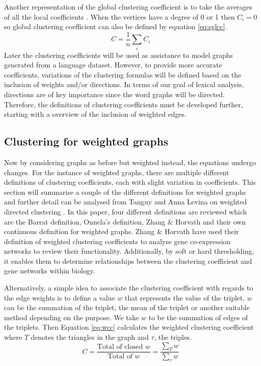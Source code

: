 Another representation of the global clustering coefficient is to take the averages of all the local coefficients \cite{https://doi.org/10.48550/arxiv.1410.1997}. When the vertices have a degree of 0 or 1 then $C_i = 0$ so global clustering coefficient can also be defined by equation \ref{eq:sglcc}.
\begin{equation} \label{eq:sglcc}
C = \frac{1}{n}\sum_i{C_i}
\end{equation}
Later the clustering coefficients will be used as assistance to model graphs generated from a language dataset. However, to provide more accurate coefficients, variations of the clustering formulas will be defined based on the inclusion of weights and/or directions. In terms of our goal of lexical analysis, directions are of key importance since the word graphs will be directed. Therefore, the definitions of clustering coefficients must be developed further, starting with a overview of the inclusion of weighted edges.

\subsection{Clustering for weighted graphs}
Now by considering graphs as before but weighted instead, the equations undergo changes. For the instance of weighted graphs, there are multiple different definitions of clustering coefficients, each with slight variation in coefficients. This section will summarise a couple of the different definitions for weighted graphs and further detail can be analysed from Tanguy and Anna Levina on weighted directed clustering \cite{PhysRevResearch.3.043124}. In this paper, four different definitions are reviewed which are the Barrat definition, Onnela's definition, Zhang \& Horvath and their own continuous definition for weighted graphs. Zhang \& Horvath \cite{ZhangHorvath+2005} have used their definition of weighted clustering coefficients to analyse gene co-expression networks to review their functionality. Additionally, by soft or hard thresholding, it enables them to determine relationships between the clustering coefficient and gene networks within biology.

Alternatively, a simple idea to associate the clustering coefficient with regards to the edge weights is to define a value $w$ that represents the value of the triplet. $w$ can be the summation of the triplet, the mean of the triplet or another suitable method depending on the purpose. We take $w$ to be the summation of edges of the triplets. Then Equation \ref{eq:wcc} calculates the weighted clustering coefficient \cite{opsahl2009clustering} where $T$ denotes the triangles in the graph and $\tau$, the triples.
\begin{equation} \label{eq:wcc}
C = \frac{\text{Total of closed }w}{\text{Total of }w} = \frac{\sum_T{w}}{\sum_\tau{w}}
\end{equation}

